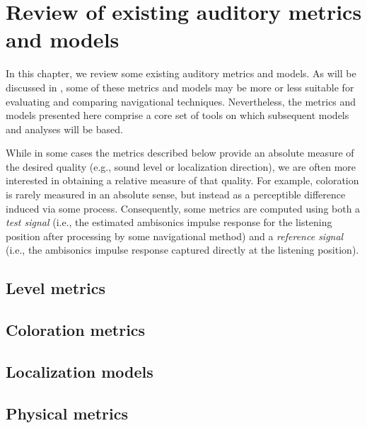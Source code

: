 \chapter{Review of existing auditory metrics and models}\label{chap:04_Auditory_Models}
In this chapter, we review some existing auditory metrics and models.
As will be discussed in , some of these metrics and models may be more or less suitable for evaluating and comparing navigational techniques.
Nevertheless, the metrics and models presented here comprise a core set of tools on which subsequent models and analyses will be based.

While in some cases the metrics described below provide an absolute measure of the desired quality (e.g., sound level or localization direction), we are often more interested in obtaining a relative measure of that quality.
For example, coloration is rarely measured in an absolute sense, but instead as a perceptible difference induced via some process.
Consequently, some metrics are computed using both a \textit{test signal} (i.e., the estimated ambisonics impulse response for the listening position after processing by some navigational method) and a \textit{reference signal} (i.e., the ambisonics impulse response captured directly at the listening position).

\section{Level metrics}\label{sec:04_Auditory_Models:Level_Metrics}


\section{Coloration metrics}\label{sec:04_Auditory_Models:Coloration_Metrics}


\section{Localization models}\label{sec:04_Auditory_Models:Localization_Models}


\section{Physical metrics}\label{sec:04_Auditory_Models:Physical_Metrics}


